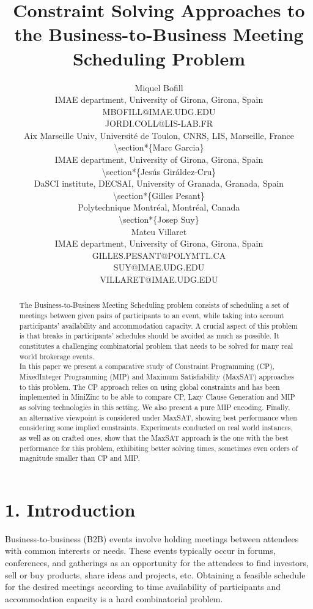 \documentclass[10pt]{article}
\title{Constraint Solving Approaches to the Business-to-Business Meeting Scheduling Problem }
\author{Miquel Bofill\\
IMAE department, University of Girona, Girona, Spain\\
MBOFILL@IMAE.UDG.EDU\\
JORDI.COLL@LIS-LAB.FR\\
Aix Marseille Univ, Université de Toulon, CNRS, LIS, Marseille, France\\
\textbackslash section*\{Marc Garcia\}\\
IMAE department, University of Girona, Girona, Spain\\
\textbackslash section*\{Jesús Giráldez-Cru\}\\
DaSCI institute, DECSAI, University of Granada, Granada, Spain\\
\textbackslash section*\{Gilles Pesant\}\\
Polytechnique Montréal, Montréal, Canada\\
\textbackslash section*\{Josep Suy\}\\
Mateu Villaret\\
IMAE department, University of Girona, Girona, Spain\\
GILLES.PESANT@POLYMTL.CA\\
SUY@IMAE.UDG.EDU\\
VILLARET@IMAE.UDG.EDU}
\date{}
\begin{document}
\maketitle
\captionsetup{singlelinecheck=false}


\begin{abstract}
The Business-to-Business Meeting Scheduling problem consists of scheduling a set of meetings between given pairs of participants to an event, while taking into account participants' availability and accommodation capacity. A crucial aspect of this problem is that breaks in participants' schedules should be avoided as much as possible. It constitutes a challenging combinatorial problem that needs to be solved for many real world brokerage events.\\
In this paper we present a comparative study of Constraint Programming (CP), MixedInteger Programming (MIP) and Maximum Satisfiability (MaxSAT) approaches to this problem. The CP approach relies on using global constraints and has been implemented in MiniZinc to be able to compare CP, Lazy Clause Generation and MIP as solving technologies in this setting. We also present a pure MIP encoding. Finally, an alternative viewpoint is considered under MaxSAT, showing best performance when considering some implied constraints. Experiments conducted on real world instances, as well as on crafted ones, show that the MaxSAT approach is the one with the best performance for this problem, exhibiting better solving times, sometimes even orders of magnitude smaller than CP and MIP.
\end{abstract}

\section*{1. Introduction}
Business-to-business (B2B) events involve holding meetings between attendees with common interests or needs. These events typically occur in forums, conferences, and gatherings as an opportunity for the attendees to find investors, sell or buy products, share ideas and projects, etc. Obtaining a feasible schedule for the desired meetings according to time availability of participants and accommodation capacity is a hard combinatorial problem.
\end{document}
